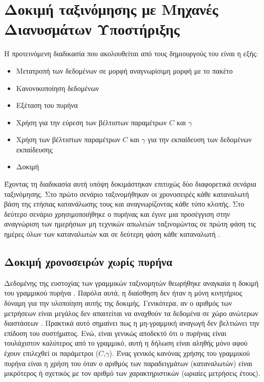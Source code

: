 \section{Δοκιμή ταξινόμησης με Μηχανές Διανυσμάτων Υποστήριξης}
Η προτεινόμενη διαδικασία που ακολουθείται από τους δημιουργούς του  είναι η εξής:
\begin{itemize}
\item Μετατροπή των δεδομένων σε μορφή αναγνωρίσιμη μορφή με το πακέτο 
\item Κανονικοποίηση δεδομένων
\item Εξέταση του  πυρήνα
\item Χρήση  για την εύρεση των βέλτιστων παραμέτρων $C$ και $\gamma$
\item Χρήση των βέλτιστων παραμέτρων $C$ και $\gamma$ για την εκπαίδευση των δεδομένων εκπαίδευσης
\item Δοκιμή
\end{itemize}
Έχοντας τη διαδικασία αυτή υπόψη δοκιμάστηκαν επιτυχώς δύο διαφορετικά σενάρια ταξινόμησης. Στο πρώτο σενάριο ταξινομήθηκαν οι χρονοσειρές κάθε καταναλωτή βάση της ετήσιας κατανάλωσης τους και αναγνωρίζοντας κάθε τύπο κλοπής. Στο δεύτερο σενάριο χρησιμοποιήθηκε ο πυρήνας  και έγινε μια προσέγγιση στην αναγνώριση των ημερήσιων μη τεχνικών απωλειών ταξινομώντας σε πρώτη φάση τις ημέρες όλων των καταναλωτών και σε δεύτερη φάση κάθε καταναλωτή \cite{libsvmguide}.
\subsection{Δοκιμή χρονοσειρών χωρίς πυρήνα}
Δεδομένης της ευστοχίας των γραμμικών ταξινομητών θεωρήθηκε αναγκαία η δοκιμή του γραμμικού πυρήνα . Παρόλα αυτά, η διαίσθηση δεν ήταν η μόνη κινητήριος δύναμη για την υλοποίηση αυτής της δοκιμής. Γενικότερα, αν ο αριθμός των μετρήσεων είναι μεγάλος δεν απαιτείται να αναχθούν τα δεδομένα σε χώρο ανώτερων διαστάσεων \cite{libsvmguide}. Πρακτικά αυτό σημαίνει πως η μη-γραμμική αναγωγή δεν βελτιώνει την επίδοση του συστήματος. Ενώ, είναι γενικώς αποδεκτό ότι ο πυρήνας  είναι τουλάχιστον καλύτερος από το γραμμικό, αυτή η δήλωση είναι αληθής μόνο αφού έχουν επιλεχθεί οι παράμετροι ($C$,$\gamma$). Ένας γενικός κανόνας χρήσης του γραμμικού πυρήνα είναι η χρήση του όταν ο αριθμός των παραδειγμάτων (καταναλωτών) είναι μικρότερος ή σχετικός με τον αριθμό των χαρακτηριστικών (ωριαίες μετρήσεις έτους).
